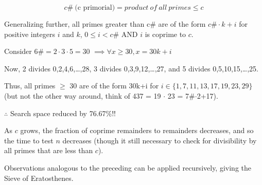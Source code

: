 \documentclass{article}
\begin{document}
$$
c\#\ \text{(c\ primorial)} = product\ of\ all\ primes \le c
$$

Generalizing further, all primes greater than c\# are of the form $c\#\cdot{k} + i$ for positive integers $i$ and $k$, $0\le{i}<{c\#}$ AND $i$ is coprime to $c$.

\vspace{0.8em}

Consider $6\#=2\cdot3\cdot5=30$
$\implies{\forall{x\ge30}}, x = 30k+i$

Now,
2 divides 0,2,4,6,\dots,28,
3 divides 0,3,9,12,\dots,27,
and 5 divides 0,5,10,15,\dots,25.

Thus, all primes $\ge$ 30 are of the form 30k+i for $i \in{\{1,7,11,13,17,19,23,29\}}$ (but not the other way around, think of 437 = 19 $\cdot$ 23 = 7\#$\cdot$2+17).

$\therefore$ Search space reduced by 76.67\%!!

\vspace{0.8em}

As $c$ grows, the fraction of coprime remainders to remainders decreases, and so the time to test $n$ decreases (though it still necessary to check for divisibility by all primes that are less than $c$).

Observations analogous to the preceding can be applied recursively, giving the Sieve of Eratosthenes.

\hrulefill
\end{document}
